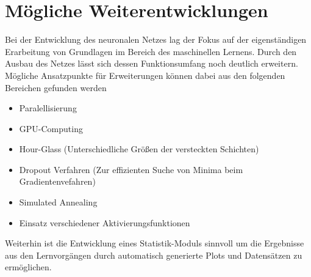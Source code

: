 \chapter{Mögliche Weiterentwicklungen}
Bei der Entwicklung des neuronalen Netzes lag der Fokus auf der eigenständigen Erarbeitung von Grundlagen im Bereich des maschinellen Lernens. Durch den Ausbau des Netzes lässt sich dessen Funktionsumfang noch deutlich erweitern. Mögliche Ansatzpunkte für Erweiterungen können dabei aus den folgenden Bereichen gefunden werden

\begin{itemize}
\item Paralellisierung
\item GPU-Computing
\item Hour-Glass (Unterschiedliche Größen der versteckten Schichten)
\item Dropout Verfahren (Zur effizienten Suche von Minima beim Gradientenvefahren)
\item Simulated Annealing
\item Einsatz verschiedener Aktivierungsfunktionen
\end{itemize}

Weiterhin ist die Entwicklung eines Statistik-Moduls sinnvoll um die Ergebnisse aus den Lernvorgängen durch automatisch generierte Plots und Datensätzen zu ermöglichen.